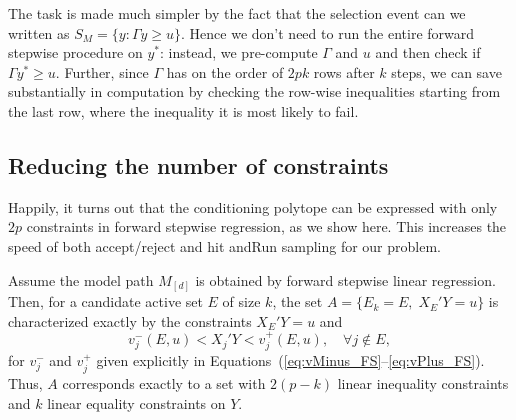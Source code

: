 \documentclass{article}
\begin{document}
The task is made much simpler by the fact that the selection event can we written as $S_M=\{y: \Gamma y \geq u\}$.
Hence we don't need to run the entire forward stepwise procedure on $y^*$: instead, we pre-compute $\Gamma$ and $u$ and then check
if $\Gamma y^* \geq u$. Further, since $\Gamma$ has on the  order of $2pk$ rows after $k$ steps,  we can save 
substantially in computation by checking the row-wise inequalities starting from the last row, where the inequality  it is most likely to fail.

\subsection{Reducing the number of constraints}
Happily, it turns out that the conditioning polytope can be expressed with only $2p$ constraints in forward stepwise regression, as we show here.
This increases the speed of both accept/reject and hit andRun sampling for our problem.

\begin{theorem}
  Assume the model path $M_{[d]}$ is obtained by forward stepwise 
  linear regression. Then, for a candidate active set $E$ of size $k$, 
  the set $A = \{E_k = E, \;X_E'Y = u\}$ is characterized 
  exactly by the constraints $X_E'Y=u$ and
  \[
  v_j^-(E,u) < X_j'Y < v_j^+(E,u), \quad\forall j \notin E,
  \]
  for $v_j^-$ and $v_j^+$ given explicitly in
  Equations~(\ref{eq:vMinus_FS}--\ref{eq:vPlus_FS}).
  Thus, $A$ corresponds exactly to 
  a set with $2(p-k)$ linear inequality constraints and $k$
  linear equality constraints on $Y$.
\end{theorem}
\end{document}
